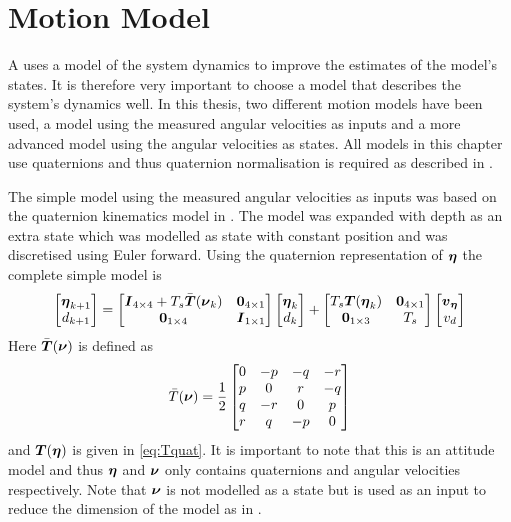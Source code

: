 \section{Motion Model}\label{sec:motion_model}
A \abbrKF uses a model of the system dynamics to improve the estimates of the model's states. It is therefore very important to choose a model that describes the system's dynamics well. In this thesis, two different motion models have been used, a model using the measured angular velocities as inputs and a more advanced model using the angular velocities as states. All models in this chapter use quaternions and thus quaternion normalisation is required as described in .

The simple model using the measured angular velocities as inputs was based on the quaternion kinematics model in \citet[p. 47]{Tornqvist}. The model was expanded with depth as an extra state which was modelled as state with constant position and was discretised using Euler forward. Using the quaternion representation of $\boldsymbol{\eta}$ the complete simple model is 
\begin{equation}
\begin{bmatrix}
\boldsymbol{\eta}_{k+1}\\
d_{k+1}
\end{bmatrix} 
=
 \begin{bmatrix}
 \boldsymbol{I}_{4\times4} + T_s \bar{\boldsymbol{T}}(\boldsymbol{\nu}_k) & \boldsymbol{0}_{4\times1}\\
 \boldsymbol{0}_{1\times4} & \boldsymbol{I}_{1\times1} 
 \end{bmatrix}
 \begin{bmatrix}
 \boldsymbol{\eta}_{k}\\
 d_k
 \end{bmatrix}
 +
  \begin{bmatrix}
  T_s \boldsymbol{T}(\boldsymbol{\eta}_{k}) & \boldsymbol{0}_{4\times1}\\
  \boldsymbol{0}_{1\times3} & T_s
  \end{bmatrix}
  \begin{bmatrix}
  \boldsymbol{v}_{\boldsymbol{\eta}}\\
  v_d 
  \end{bmatrix}
\end{equation}
Here $\bar{\boldsymbol{T}}(\boldsymbol{\nu})$ is defined as
\begin{equation}
\bar{T}(\boldsymbol{\nu}) = \frac{1}{2}
\begin{bmatrix}
     0 &-p &-q &-r\\
     p & 0 & r &-q\\
     q &-r & 0 & p\\
     r & q &-p & 0
\end{bmatrix}
\end{equation} and $\boldsymbol{T}(\boldsymbol{\eta})$ is given in \eqref{eq:Tquat}.
It is important to note that this is an attitude model and thus $\boldsymbol{\eta}$ and $\boldsymbol{\nu}$ only contains quaternions and angular velocities respectively. Note that $\boldsymbol{\nu}$ is not modelled as a state but is used as an input to reduce the dimension of the model as in \citet{Tornqvist}. 

